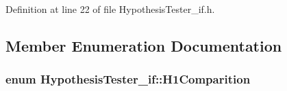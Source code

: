 Definition at line 22 of file Hypothesis\-Tester\-\_\-if.\-h.



\subsection{Member Enumeration Documentation}
\hypertarget{class_hypothesis_tester__if_a89153ff990252f9f79856a2f2532c349}{
\subsubsection[{H1\-Comparition}]{\setlength{\rightskip}{0pt plus 5cm}enum {\bf Hypothesis\-Tester\-\_\-if\-::\-H1\-Comparition}}}\label{class_hypothesis_tester__if_a89153ff990252f9f79856a2f2532c349}
